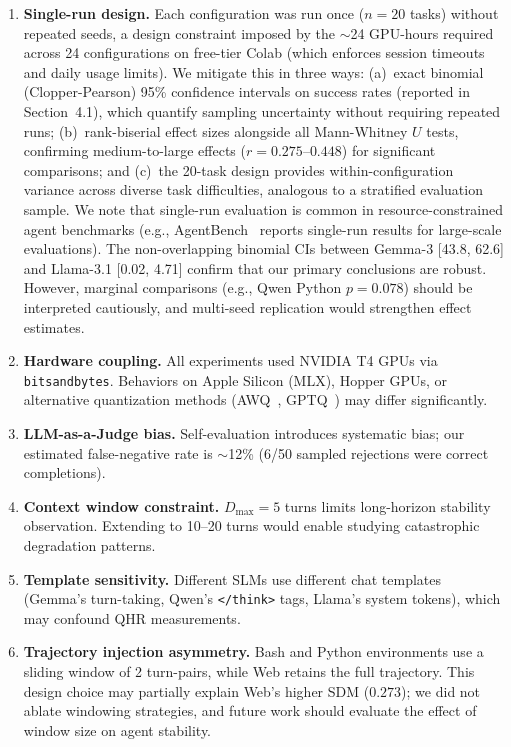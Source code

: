 \documentclass{article}
\begin{document}
\begin{enumerate}[nosep,leftmargin=*]
  \item \textbf{Single-run design.} Each configuration was run once ($n{=}20$ tasks) without repeated seeds, a design constraint imposed by the $\sim$24 GPU-hours required across 24 configurations on free-tier Colab (which enforces session timeouts and daily usage limits). We mitigate this in three ways: (a)~exact binomial (Clopper-Pearson) 95\% confidence intervals on success rates (reported in Section~4.1), which quantify sampling uncertainty without requiring repeated runs; (b)~rank-biserial effect sizes alongside all Mann-Whitney $U$ tests, confirming medium-to-large effects ($r{=}0.275$--$0.448$) for significant comparisons; and (c)~the 20-task design provides within-configuration variance across diverse task difficulties, analogous to a stratified evaluation sample. We note that single-run evaluation is common in resource-constrained agent benchmarks (e.g., AgentBench~\cite{liu2023agentbench} reports single-run results for large-scale evaluations). The non-overlapping binomial CIs between Gemma-3 [43.8, 62.6] and Llama-3.1 [0.02, 4.71] confirm that our primary conclusions are robust. However, marginal comparisons (e.g., Qwen Python $p{=}0.078$) should be interpreted cautiously, and multi-seed replication would strengthen effect estimates.
  \item \textbf{Hardware coupling.} All experiments used NVIDIA T4 GPUs via \texttt{bitsandbytes}. Behaviors on Apple Silicon (MLX), Hopper GPUs, or alternative quantization methods (AWQ~\cite{lin2024awq}, GPTQ~\cite{frantar2023gptq}) may differ significantly.
  \item \textbf{LLM-as-a-Judge bias.} Self-evaluation introduces systematic bias; our estimated false-negative rate is $\sim$12\% (6/50 sampled rejections were correct completions).
  \item \textbf{Context window constraint.} $D_{\max}{=}5$ turns limits long-horizon stability observation. Extending to 10--20 turns would enable studying catastrophic degradation patterns.
  \item \textbf{Template sensitivity.} Different SLMs use different chat templates (Gemma's turn-taking, Qwen's \texttt{</think>} tags, Llama's system tokens), which may confound QHR measurements.
  \item \textbf{Trajectory injection asymmetry.} Bash and Python environments use a sliding window of 2 turn-pairs, while Web retains the full trajectory. This design choice may partially explain Web's higher SDM ($0.273$); we did not ablate windowing strategies, and future work should evaluate the effect of window size on agent stability.

\end{enumerate}
\end{document}
